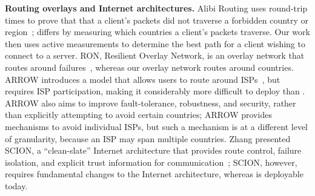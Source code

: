 {\bf Routing overlays and Internet architectures.} Alibi Routing uses
round-trip times to prove that that a client's packets did  not traverse a
forbidden country or region~\cite{levin2015alibi,levin_detour}; \system{} differs by
measuring  which countries a client's packets traverse.  Our
work then  uses active measurements to determine the best path for a client
wishing  to connect to a server.  RON, Resilient Overlay Network, is an
overlay network that  routes around failures~\cite{andersen2001resilient}, whereas our overlay network
routes around countries.  ARROW introduces a
model that allows users to route around ISPs~\cite{peter2015one}, but requires
ISP participation, making it considerably more difficult to deploy than
\system{}. ARROW also aims to improve fault-tolerance, robustness, and
security, rather than explicitly attempting to avoid certain countries; ARROW
provides mechanisms to avoid individual ISPs, but such a mechanism is at a
different level of granularity, because an ISP may span multiple countries.
Zhang \ea{} presented SCION, a ``clean-slate'' Internet architecture that
provides route control, failure isolation, and explicit trust information for
communication~\cite{zhang2011scion}; SCION, however, requires fundamental
changes to the Internet architecture, whereas \system{} is deployable today.


